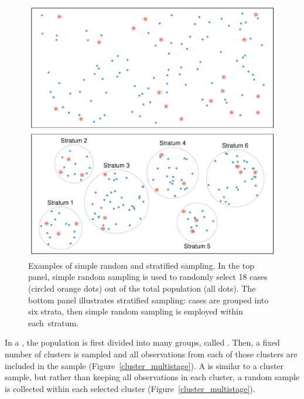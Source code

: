 \begin{figure}
	\centering
	\includegraphics[width=\textwidth]{ch_intro_to_data_oi_biostat/figures/samplingMethodsFigure/simple_stratified}
	\caption{Examples of simple random and stratified sampling. In the top panel, simple random sampling is used to randomly select 18 cases (circled orange dots) out of the total population (all dots). The bottom panel illustrates stratified sampling: cases are grouped into six strata, then simple random sampling is employed within \mbox{each stratum}.}
	\label{simple_stratified}
\end{figure}

In a , the population is first divided into many groups, called . Then, a fixed number of clusters is sampled and all observations from each of those clusters are included in the sample (Figure~\ref{cluster_multistage}). A  is similar to a cluster sample, but rather than keeping all observations in each cluster, a random sample is collected within each selected cluster (Figure~\ref{cluster_multistage}).

